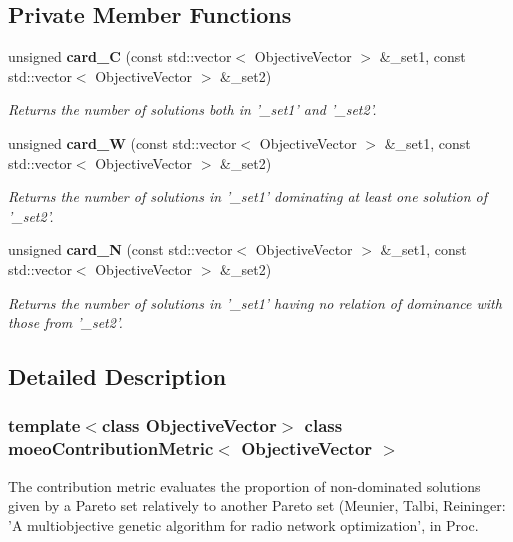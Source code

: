 \subsection*{Private Member Functions}
\begin{CompactItemize}
\item 
unsigned {\bf card\_\-C} (const std::vector$<$ Objective\-Vector $>$ \&\_\-set1, const std::vector$<$ Objective\-Vector $>$ \&\_\-set2)
\begin{CompactList}\small\item\em Returns the number of solutions both in '\_\-set1' and '\_\-set2'. \item\end{CompactList}\item 
unsigned {\bf card\_\-W} (const std::vector$<$ Objective\-Vector $>$ \&\_\-set1, const std::vector$<$ Objective\-Vector $>$ \&\_\-set2)
\begin{CompactList}\small\item\em Returns the number of solutions in '\_\-set1' dominating at least one solution of '\_\-set2'. \item\end{CompactList}\item 
unsigned {\bf card\_\-N} (const std::vector$<$ Objective\-Vector $>$ \&\_\-set1, const std::vector$<$ Objective\-Vector $>$ \&\_\-set2)
\begin{CompactList}\small\item\em Returns the number of solutions in '\_\-set1' having no relation of dominance with those from '\_\-set2'. \item\end{CompactList}\end{CompactItemize}


\subsection{Detailed Description}
\subsubsection*{template$<$class Objective\-Vector$>$ class moeo\-Contribution\-Metric$<$ Objective\-Vector $>$}

The contribution metric evaluates the proportion of non-dominated solutions given by a Pareto set relatively to another Pareto set (Meunier, Talbi, Reininger: 'A multiobjective genetic algorithm for radio network optimization', in Proc. 

